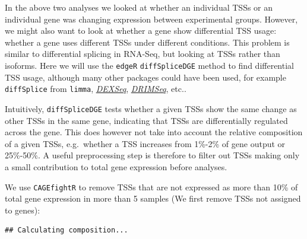\documentclass[9pt,a4paper,]{extarticle}
\newenvironment{Shaded}{\begin{snugshade}}{\end{snugshade}}
\newcommand{\KeywordTok}[1]{\textcolor[rgb]{0.13,0.29,0.53}{\textbf{{#1}}}}
\newcommand{\DataTypeTok}[1]{\textcolor[rgb]{0.13,0.29,0.53}{{#1}}}
\newcommand{\DecValTok}[1]{\textcolor[rgb]{0.00,0.00,0.81}{{#1}}}
\newcommand{\FloatTok}[1]{\textcolor[rgb]{0.00,0.00,0.81}{{#1}}}
\newcommand{\StringTok}[1]{\textcolor[rgb]{0.31,0.60,0.02}{{#1}}}
\newcommand{\CommentTok}[1]{\textcolor[rgb]{0.56,0.35,0.01}{\textit{{#1}}}}
\newcommand{\NormalTok}[1]{{#1}}
\begin{document}
In the above two analyses we looked at whether an individual TSSs or an individual gene was changing expression between experimental groups. However, we might also want to look at whether a gene show differential TSS usage: whether a gene uses different TSSs under different conditions. This problem is similar to differential splicing in RNA-Seq, but looking at TSSs rather than isoforms\citep{Soneson2016}. Here we will use the \texttt{edgeR} \texttt{diffSpliceDGE} method to find differential TSS usage, although many other packages could have been used, for example \texttt{diffSplice} from \texttt{limma}, \emph{\href{https://bioconductor.org/packages/3.8/DEXSeq}{DEXSeq}}, \emph{\href{https://bioconductor.org/packages/3.8/DRIMSeq}{DRIMSeq}}, etc..

Intuitively, \texttt{diffSpliceDGE} tests whether a given TSSs show the same change as other TSSs in the same gene, indicating that TSSs are differentially regulated across the gene. This does however not take into account the relative composition of a given TSSs, e.g.~whether a TSS increases from 1\%-2\% of gene output or 25\%-50\%. A useful preprocessing step is therefore to filter out TSSs making only a small contribution to total gene expression before analyses.

We use \texttt{CAGEfightR} to remove TSSs that are not expressed as more than 10\% of total gene expression in more than 5 samples (We first remove TSSs not assigned to genes):

\begin{Shaded}
\end{Shaded}

\begin{verbatim}
## Calculating composition...
\end{verbatim}
\end{document}
